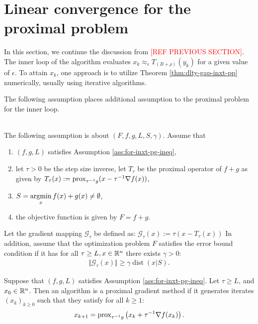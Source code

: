 \documentclass[12pt]{article}
\DeclareMathOperator{\dist}{\mathop{dist}}
\begin{document}
\section{Linear convergence for the proximal problem}
    In this section, we continue the discussion from \textcolor{red}{[REF PREVIOUS SECTION]}. 
    The inner loop of the algorithm evaluates $x_k \approx_\epsilon T_{(B + \rho)}(y_k)$ for a given value of $\epsilon$. 
    To attain $x_k$, one approach is to utilize Theorem \ref{thm:dlty-gap-inxt-pp} numerically, usually using iterative algorithms. 
    \par
    The following assumption places additional assumption to the proximal problem for the inner loop. 
    \begin{assumption}\;\label{ass:pg-eb}\\
        The following assumption is about $(F, f, g, L, S, \gamma)$. 
        Assume that
        \begin{enumerate}[nosep]
            \item $(f, g, L)$ satisfies Assumption \ref{ass:for-inxt-pg-ineq}, 
            \item let $\tau > 0$ be the step size inverse, let $T_{\tau}$ be the proximal operator of $f + g$ as given by $T_{\tau}(x) := \operatorname{prox}_{\tau^{-1}g}(x - \tau^{-1}\nabla f(x))$, 
            \item $S= \mathop{\rm argmin}\limits_{x}{f(x) + g(x)} \neq \emptyset$, 
            \item the objective function is given by $F = f + g$. 
        \end{enumerate}   
        Let the gradient mapping $\mathcal G_{\tau}$ be defined as: $\mathcal G_\tau(x) := \tau (x - T_\tau(x))$     
        In addition, assume that the optimization problem $F$ satisfies the error bound condition if it has for all $\tau \ge L, x \in \mathbb R^n$ there exists $\gamma > 0$: 
        \begin{align*}
            \Vert \mathcal G_\tau(x)\Vert \ge \gamma\dist(x|S). 
        \end{align*}
    \end{assumption}
    \begin{definition}\label{def:ista}
        Suppose that $(f, g, L)$ satisfies Assumption \ref{ass:for-inxt-pg-ineq}. 
        Let $\tau \ge L$, and $x_0 \in \mathbb R^n$. 
        Then an algorithm is a proximal gradient method if it generates iterates $(x_k)_{k \ge 0}$ such that they satisfy for all $k \ge 1$: 
        \begin{align*}
            x_{k + 1} = \operatorname{prox}_{\tau^{-1} g}\left(x_k + \tau^{-1}\nabla f(x_k)\right). 
        \end{align*}
    \end{definition}
\end{document}
